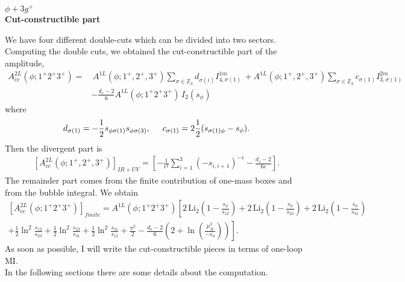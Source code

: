 \documentclass{article}
\numberwithin{equation}{section}
\begin{document}
\renewcommand{\abstractname}{\vspace{-\baselineskip}}
\newpage
\begin{center}
\vspace{0.5cm}
	\textbf{\Large $\phi+3g^+$}\\\vspace{0.1cm}
	\textbf{\large Cut-constructible part}
	\vspace{0.5cm}
\end{center}
{
	\hypersetup{linkcolor=teal,linktoc=page}
	\thispagestyle{empty}
}

\noindent We have four different double-cuts which can be divided into two sectors.
Computing the double cuts, we obtained the cut-constructible part of the amplitude,
\begin{align*}
A^{2L}_{cc}(\phi;1^+2^+3^+)=&\, A^{1L}(\phi;1^+,2^+,3^+)\sum_{\sigma\in \mathbb{Z}_3} d_{\sigma(i)} I_{4,\sigma(1)}^{1m}\,+A^{1L}(\phi;1^+,2^+,3^+)\sum_{\sigma\in \mathbb{Z}_3} c_{\sigma(1)} I_{3,\sigma(1)}^{2m}\\&-\frac{d_s-2}{6} A^{1L}(\phi;1^+2^+3^+)\, I_2(s_\phi)
\end{align*}
where
\begin{align*}
	d_{\sigma(1)}=-\frac{1}{2}s_{\phi \sigma(1)}s_{\phi\sigma(3)}, \hspace{0.5cm}c_{\sigma(1)}=2\frac{1}{2}(s_{\sigma(1)\phi}-s_\phi).
\end{align*}
Then the divergent part is
\begin{align*}
	\left[A^{2L}_{cc}(\phi;1^+,2^+,3^+)\right]_{IR+UV}=\left[-\frac{1}{\epsilon^2}\sum_{i=1}^3 \left(-s_{i,i+1}\right)^{-\epsilon}-\frac{d_s-2}{6\epsilon}\right].
\end{align*}
The remainder part comes from the finite contribution of one-mass boxes and from the bubble integral. We obtain
\begin{align*}
	\left[A^{2L}_{cc}(\phi;1^+2^+3^+)\right]_{finite}=A^{1L}(\phi;1^+2^+3^+)\left[2\,\text{Li}_2\left(1-\frac{s_\phi}{s_{12}}\right)+2\,\text{Li}_2\left(1-\frac{s_\phi}{s_{23}}\right)+2\,\text{Li}_2\left(1-\frac{s_\phi}{s_{31}}\right) \right.\\ \left.
+\frac{1}{2}\ln^2\frac{s_{12}}{s_{23}}+\frac{1}{2}\ln^2\frac{s_{23}}{s_{31}}+\frac{1}{2}\ln^2\frac{s_{31}}{s_{12}}+\frac{\pi^2}{2}-\frac{d_s-2}{6}\left(2+\ln\left(\frac{\mu_R^2}{-s_\phi}\right)\right)\right].
\end{align*}
As soon as possible, I will write the cut-constructible pieces in terms of one-loop MI.\\
In the following sections there are some details about the computation.
\end{document}
